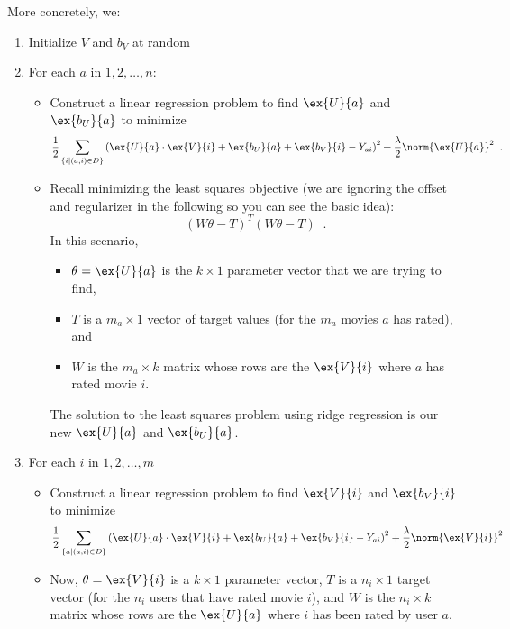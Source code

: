 \vspace*{0.3cm}
\noindent More concretely, we:
\begin{enumerate}
  \item Initialize $V$ and $b_V$ at random
  \item For each $a$ in $1, 2, \ldots, n$:
        \begin{itemize}
          \item Construct a linear regression problem to find $\ex{U}{a}$ and $\ex{b_U}{a}$
                to minimize
                \[\frac{1}{2}\sum_{\{i \mid (a,i) \in D\}}
                  \left(\ex{U}{a}\cdot \ex{V}{i} + \ex{b_U}{a} + \ex{b_V}{i}
                  - Y_{ai}\right)^2 + \frac{\lambda}{2}\norm{\ex{U}{a}}^2
                  \;\;.\]
          \item Recall minimizing the least squares objective (we are
                ignoring the offset and regularizer in the following so you
                can see the basic idea):
                \[(W\theta - T)^T(W\theta - T)\;\;.\]
                In this scenario,
                \begin{itemize}
                  \item $\theta = \ex{U}{a}$ is the $k \times 1$ parameter
                        vector that we are trying to find,
                  \item $T$ is a $m_a \times 1$ vector of target values
                        (for the $m_a$ movies $a$ has rated), and
                  \item  $W$ is the $m_a \times k$ matrix whose rows are the $\ex{V}{i}$
                        where $a$ has rated movie $i$.
                \end{itemize}
                The solution to the least squares problem using ridge
                regression is our new  $\ex{U}{a}$ and $\ex{b_U}{a}$.
        \end{itemize}
  \item For each $i$ in $1, 2, \ldots, m$
        \begin{itemize}
          \item Construct a linear regression problem to find $\ex{V}{i}$
                and $\ex{b_V}{i}$
                to minimize
                \[\frac{1}{2}\sum_{\{a \mid (a,i) \in D\}}
                  \left(\ex{U}{a}\cdot \ex{V}{i} + \ex{b_U}{a} + \ex{b_V}{i}
                  - Y_{ai}\right)^2 + \frac{\lambda}{2}\norm{\ex{V}{i}}^2
                \]
          \item Now, $\theta = \ex{V}{i}$ is a $k \times 1$
                parameter vector, $T$ is a $n_i \times 1$ target vector
                (for the $n_i$ users that have rated movie $i$), and $W$ is
                the $n_i \times k$ matrix whose rows are the $\ex{U}{a}$
                where $i$ has been rated by user $a$.


\end{itemize}
\end{enumerate}
